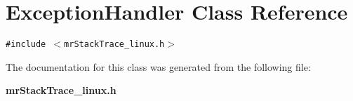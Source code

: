 \section{Exception\-Handler Class Reference}
\label{classExceptionHandler}
{\tt \#include $<$mr\-Stack\-Trace\_\-linux.h$>$}



The documentation for this class was generated from the following file:\begin{CompactItemize}
\item 
{\bf mr\-Stack\-Trace\_\-linux.h}\end{CompactItemize}
